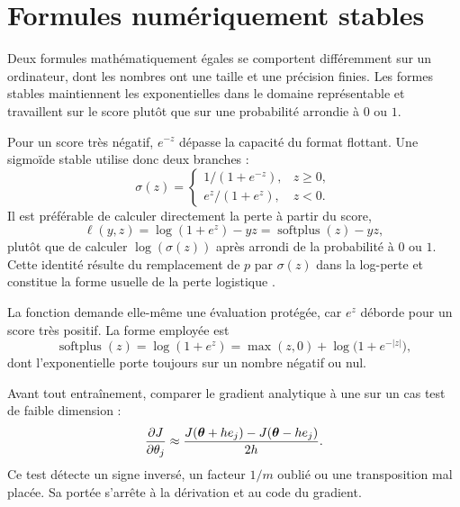 \section{Formules numériquement stables}

\begin{lecture}
Deux formules mathématiquement égales se comportent différemment sur un
ordinateur, dont les nombres ont une taille et une précision finies. Les formes
stables maintiennent les exponentielles dans le domaine représentable et
travaillent sur le score plutôt que sur une probabilité arrondie à $0$ ou $1$.
\end{lecture}

Pour un score très négatif, $e^{-z}$ dépasse la capacité du format flottant. Une
sigmoïde stable utilise donc deux branches :
\[
  \sigma(z)=
  \begin{cases}
    1/(1+e^{-z}),&z\geq0,\\
    e^z/(1+e^z),&z<0.
  \end{cases}
\]
Il est préférable de calculer directement la perte à partir du score,
\[
  \ell(y,z)=\log(1+e^z)-yz=\operatorname{softplus}(z)-yz,
\]
plutôt que de calculer $\log(\sigma(z))$ après arrondi de la probabilité à $0$
ou $1$. Cette identité résulte du remplacement de $p$ par $\sigma(z)$ dans la
log-perte et constitue la forme usuelle de la perte logistique
\cite[sec.~7.1]{murphy2022}.

La fonction  demande elle-même une évaluation protégée, car $e^z$ déborde
pour un score très positif. La forme employée est
\[
  \operatorname{softplus}(z)=\log(1+e^z)=\max(z,0)+\log\bigl(1+e^{-|z|}\bigr),
\]
dont l'exponentielle porte toujours sur un nombre négatif ou nul.

\begin{resultat}
Avant tout entraînement, comparer le gradient analytique à une  sur un cas test de faible dimension :
\[
  \frac{\partial J}{\partial\theta_j}\approx
  \frac{J(\boldsymbol{\theta}+h e_j)-J(\boldsymbol{\theta}-h e_j)}{2h}.
\]
Ce test détecte un signe inversé, un facteur $1/m$ oublié ou une transposition
mal placée. Sa portée s'arrête à la dérivation et au code du gradient.
\end{resultat}

